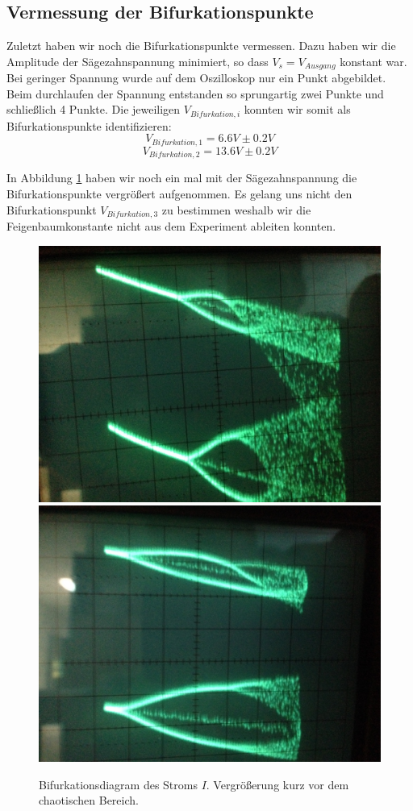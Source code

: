 \documentclass[12pt,a4paper]{article}
\begin{document}
\subsection { Vermessung der Bifurkationspunkte }
Zuletzt haben wir noch die Bifurkationspunkte vermessen. Dazu haben wir die Amplitude der Sägezahnspannung minimiert, so dass $V_s=V_{Ausgang}$ konstant war. Bei geringer Spannung wurde auf dem Oszilloskop nur ein Punkt abgebildet. Beim durchlaufen der Spannung entstanden so sprungartig zwei Punkte und schließlich 4 Punkte. Die jeweiligen $V_{Bifurkation, i}$ konnten wir somit als Bifurkationspunkte identifizieren: 
$$V_{Bifurkation, 1}=6.6V \pm 0.2V$$
$$V_{Bifurkation, 2}=13.6V \pm 0.2V$$

In Abbildung \ref{fig:ldr-bifurc-zoom} haben wir noch ein mal mit der Sägezahnspannung die Bifurkationspunkte vergrößert aufgenommen. Es gelang uns nicht den Bifurkationspunkt $V_{Bifurkation, 3}$ zu bestimmen weshalb wir die Feigenbaumkonstante nicht aus dem Experiment ableiten konnten.

\begin{figure}[!htbp]
\centering
\includegraphics[scale=0.18]{bif-ldr/bifurc-zoom}
\includegraphics[scale=0.18]{bif-ldr/bifurc-zoom2}
\caption{Bifurkationsdiagram des Stroms $I$. Vergrößerung kurz vor dem chaotischen Bereich.}
\label{fig:ldr-bifurc-zoom}
\end{figure}
\end{document}

